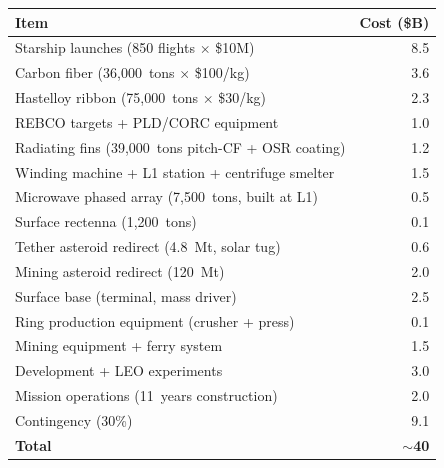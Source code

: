 \documentclass[12pt,letterpaper]{article}
\begin{document}
\begin{center}
\small
\begin{tabular}{lr}
\toprule
\textbf{Item} & \textbf{Cost (\$B)} \\
\midrule
Starship launches (850 flights $\times$ \$10M)\footnotemark & 8.5 \\
Carbon fiber (36,000~tons $\times$ \$100/kg) & 3.6 \\
Hastelloy ribbon (75,000~tons $\times$ \$30/kg) & 2.3 \\
REBCO targets + PLD/CORC equipment & 1.0 \\
Radiating fins (39,000~tons pitch-CF + OSR coating) & 1.2 \\
Winding machine + L1 station + centrifuge smelter & 1.5 \\
Microwave phased array (7,500~tons, built at L1) & 0.5 \\
Surface rectenna (1,200~tons) & 0.1 \\
Tether asteroid redirect (4.8~Mt, solar tug) & 0.6 \\
Mining asteroid redirect (120~Mt) & 2.0 \\
Surface base (terminal, mass driver) & 2.5 \\
Ring production equipment (crusher + press) & 0.1 \\
Mining equipment + ferry system & 1.5 \\
Development + LEO experiments & 3.0 \\
Mission operations (11~years construction) & 2.0 \\
Contingency (30\%) & 9.1 \\
\midrule
\textbf{Total} & $\sim$\textbf{40} \\
\bottomrule
\end{tabular}
\end{center}

\end{document}
